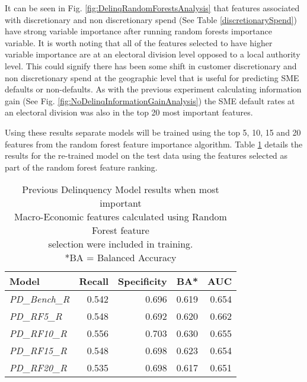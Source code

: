 It can be seen in Fig. \ref{fig:DelinqRandomForestsAnalysis} that features associated with discretionary and non discretionary spend (See Table \ref{discretionarySpend}) have strong variable importance after running random forests importance variable. It is worth noting that all of the features selected to have higher variable importance are at an electoral division level opposed to a local authority level. This could signify there has been some shift in customer discretionary and non discretionary spend at the geographic level that is useful for predicting SME defaults or non-defaults. As with the previous experiment calculating information gain  (See Fig. \ref{fig:NoDelinqInformationGainAnalysis}) the SME default rates at an electoral division was also in the top 20 most important features.

Using these results separate models will be trained using the top 5, 10, 15 and 20 features from
the random forest feature importance algorithm. Table \ref{table:RFPDModelResults} details the results for the re-trained model
on the test data using the features selected as part of the random forest feature ranking.

\begin{table}[H]
\centering
\small
		\begin{tabular}{l r r r r}
			\hline
			\textbf{Model} & \textbf{Recall} & \textbf{Specificity} & \textbf{BA*} & \textbf{AUC}  \\ \hline
			\textit{PD\_Bench\_R} & 0.542 & 0.696 & 0.619 & 0.654 \\ \hline
			\textit{PD\_RF5\_R} & 0.548 & 0.692 & 0.620 & \cellcolor{green!25}0.662   \\ 
			\textit{PD\_RF10\_R} & \cellcolor{green!25}0.556 & \cellcolor{green!25}0.703 & \cellcolor{green!25}0.630 & 0.655  \\ 
			\textit{PD\_RF15\_R} & 0.548 & 0.698 & 0.623 & 0.654  \\
			\textit{PD\_RF20\_R} & 0.535 & 0.698 & 0.617 & 0.651  \\\hline 
		\end{tabular}

	\caption{Previous Delinquency Model results when most important\\
Macro-Economic features calculated using Random Forest feature \\selection were included in training.
\\ *BA = Balanced Accuracy}
	\label{table:RFPDModelResults}
\end{table}

